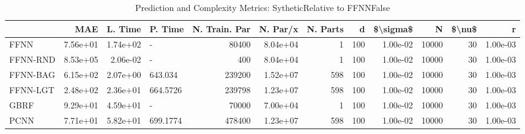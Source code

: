 \begin{table}
\centering
\caption{Prediction and Complexity Metrics: SytheticRelative to FFNNFalse}
\label{tab__Sythetic__Fix_Neurons_QTrue}
\begin{tabular}{lrrlrrrrrrrr}
\toprule
{} &      MAE &  L. Time &   P. Time &  N. Train. Par &  N. Par/x &  N. Parts &    d &  \$\textbackslash sigma\$ &      N &  \$\textbackslash nu\$ &        r \\
\midrule
FFNN     & 7.56e+01 & 1.74e+02 &         - &          80400 &  8.04e+04 &         1 &  100 &  1.00e-02 &  10000 &     30 & 1.00e-03 \\
FFNN-RND & 8.53e+05 & 2.06e-02 &         - &            400 &  8.04e+04 &         1 &  100 &  1.00e-02 &  10000 &     30 & 1.00e-03 \\
FFNN-BAG & 6.15e+02 & 2.07e+00 &   643.034 &         239200 &  1.52e+07 &       598 &  100 &  1.00e-02 &  10000 &     30 & 1.00e-03 \\
FFNN-LGT & 2.48e+02 & 2.36e+01 &  664.5726 &         239798 &  1.23e+07 &       598 &  100 &  1.00e-02 &  10000 &     30 & 1.00e-03 \\
GBRF     & 9.29e+01 & 4.59e+01 &         - &          70000 &  7.00e+04 &         1 &  100 &  1.00e-02 &  10000 &     30 & 1.00e-03 \\
PCNN     & 7.71e+01 & 5.82e+01 &  699.1774 &         478400 &  1.23e+07 &       598 &  100 &  1.00e-02 &  10000 &     30 & 1.00e-03 \\
\bottomrule
\end{tabular}
\end{table}

